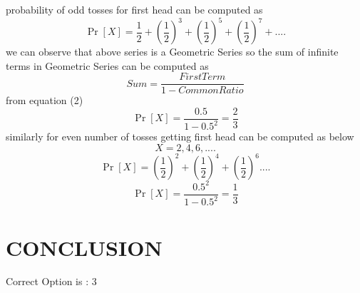 \documentclass[journal,12pt,twocolumn]{IEEEtran}
\begin{document}
probability of odd tosses for first head can be computed as
\begin{equation}
    \Pr[X]=\frac{1}{2}+(\frac{1}{2})^3+(\frac{1}{2})^5+(\frac{1}{2})^7+....
\end{equation}
we can observe that above series is a Geometric Series so the sum of infinite terms in Geometric Series can be computed as
\begin{equation}
    Sum=\frac{FirstTerm}{1-Common Ratio}
\end{equation}
from equation (2)
\begin{equation}
    \Pr[X]=\frac{0.5}{1-0.5^2}=\frac{2}{3}
\end{equation}
similarly for even number of tosses getting first head can be computed as below 
\begin{equation}
    X=2,4,6,....
\end{equation}
\begin{equation}
    \Pr[X]=(\frac{1}{2})^2+(\frac{1}{2})^4+(\frac{1}{2})^6....
\end{equation}
\begin{equation}
    \Pr[X]=\frac{0.5^2}{1-0.5^2}=\frac{1}{3}
\end{equation}

\section{\textbf{CONCLUSION}}
        Correct Option is : 3
\end{document}
